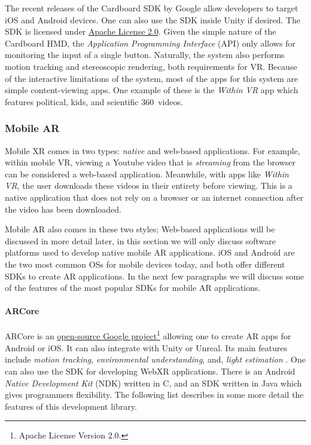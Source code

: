 The recent releases of the Cardboard SDK by Google allow developers to target iOS and Android devices. One can also use the SDK inside Unity if desired. The SDK is licensed under \href{https://www.apache.org/licenses/LICENSE-2.0.html}{Apache License 2.0}. Given the simple nature of the Cardboard HMD, the \textit{Application Programming Interface} (API) only allows for monitoring the input of a single button. Naturally, the system also performs motion tracking and stereoscopic rendering, both requirements for VR. Because of the interactive limitations of the system, most of the apps for this system are simple content-viewing apps. One example of these is the \textit{Within VR} app which features political, kids, and scientific 360\textdegree \ videos. 

\subsubsection{Mobile AR}

Mobile XR comes in two types: \textit{native} and web-based applications. For example, within mobile VR, viewing a Youtube video that is \textit{streaming} from the browser can be considered a web-based application. Meanwhile, with apps like \textit{Within VR}, the user downloads these videos in their entirety before viewing. This is a native application that does not rely on a browser or an internet connection after the video has been downloaded. 

Mobile AR also comes in these two styles; Web-based applications will be discussed in more detail later, in this section we will only discuss software platforms used to develop native mobile AR applications. iOS and Android are the two most common OSs for mobile devices today, and both offer different SDKs to create AR applications. In the next few paragraphs we will discuss some of the features of the most popular SDKs for mobile AR applications. 

\paragraph{ARCore}

ARCore is an \href{https://github.com/google-ar}{open-source Google project}\footnote{Apache License Version 2.0.} allowing one to create AR apps for Android or iOS. It can also integrate with Unity or Unreal. Its main features include \textit{motion tracking}, \textit{environmental understanding}, and, \textit{light estimation} \cite{Fundamen38online}. One can also use the SDK for developing WebXR applications. There is an Android \textit{Native Development Kit} (NDK) written in C, and an SDK written in Java which gives programmers flexibility. The following list describes in some more detail the features of this development library.


